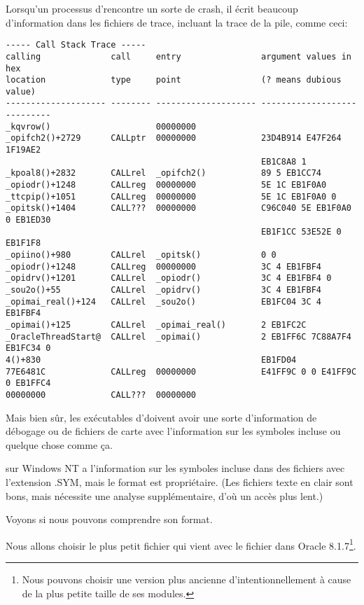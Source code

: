 \myindex{\oracle}
\label{Oracle_SYM_files_example}

Lorsqu'un processus d'\oracle rencontre un sorte de crash, il écrit beaucoup d'information
dans les fichiers de trace, incluant la trace de la pile, comme ceci:

\begin{lstlisting}
----- Call Stack Trace -----
calling              call     entry                argument values in hex      
location             type     point                (? means dubious value)     
-------------------- -------- -------------------- ----------------------------
_kqvrow()                     00000000             
_opifch2()+2729      CALLptr  00000000             23D4B914 E47F264 1F19AE2
                                                   EB1C8A8 1
_kpoal8()+2832       CALLrel  _opifch2()           89 5 EB1CC74
_opiodr()+1248       CALLreg  00000000             5E 1C EB1F0A0
_ttcpip()+1051       CALLreg  00000000             5E 1C EB1F0A0 0
_opitsk()+1404       CALL???  00000000             C96C040 5E EB1F0A0 0 EB1ED30
                                                   EB1F1CC 53E52E 0 EB1F1F8
_opiino()+980        CALLrel  _opitsk()            0 0
_opiodr()+1248       CALLreg  00000000             3C 4 EB1FBF4
_opidrv()+1201       CALLrel  _opiodr()            3C 4 EB1FBF4 0
_sou2o()+55          CALLrel  _opidrv()            3C 4 EB1FBF4
_opimai_real()+124   CALLrel  _sou2o()             EB1FC04 3C 4 EB1FBF4
_opimai()+125        CALLrel  _opimai_real()       2 EB1FC2C
_OracleThreadStart@  CALLrel  _opimai()            2 EB1FF6C 7C88A7F4 EB1FC34 0
4()+830                                            EB1FD04
77E6481C             CALLreg  00000000             E41FF9C 0 0 E41FF9C 0 EB1FFC4
00000000             CALL???  00000000             
\end{lstlisting}

Mais bien sûr, les exécutables d'\oracle doivent avoir une sorte d'information de
débogage ou de fichiers de carte avec l'information sur les symboles incluse ou
quelque chose comme ça.

\oracle sur Windows NT a l'information sur les symboles incluse dans des fichiers
avec l'extension .SYM, mais le format est propriétaire. (Les fichiers texte en clair
sont bons, mais nécessite une analyse supplémentaire, d'où un accès plus lent.)

Voyons si nous pouvons comprendre son format.

Nous allons choisir le plus petit fichier  qui vient avec le fichier
 dans Oracle 8.1.7\footnote{Nous pouvons choisir une version plus
ancienne d'\oracle intentionnellement à cause de la plus petite taille de ses modules.}.

